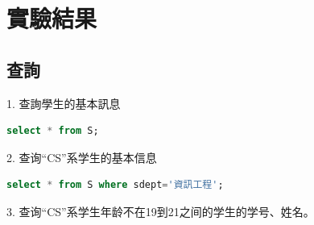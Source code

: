 \documentclass[12pt, a4paper]{report}
\begin{document}
\section{實驗結果}

\subsection{查詢}

1. 查詢學生的基本訊息\\

\begin{lstlisting}[language=SQL]
    select * from S;
\end{lstlisting}

\begin{figure}[H] %
    \centering %
\end{figure}
2. 查询“CS”系学生的基本信息\\

\begin{lstlisting}[language=SQL]
    select * from S where sdept='資訊工程';
\end{lstlisting}

\begin{figure}[H] %
    \centering %
\end{figure}
3. 查询“CS”系学生年龄不在19到21之间的学生的学号、姓名。\\
\end{document}
